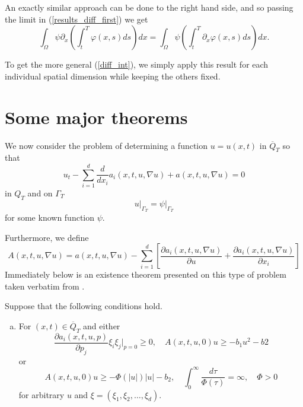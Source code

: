 \documentclass[11pt, a4paper]{article}
\begin{document}
\begin{appendices}
An exactly similar approach can be done to the right hand side, and so passing the limit in (\ref{results_diff_first}) we get
\begin{equation}
\label{result_diff_final}
\int_\Omega \psi \partial_x\left(\int_t^T \varphi(x,s)ds\right)dx = \int_\Omega \psi \left( \int_t^T \partial_x \varphi(x,s)ds \right) dx.
\end{equation}

To get the more general (\ref{diff_int}), we simply apply this result for each individual spatial dimension while keeping the others fixed.
\section{Some major theorems}
We now consider the problem of determining a function $u = u(x,t)$ in $\overline{Q}_T$ so that
\begin{equation}
\label{lady_parabolic_eq}
	u_t - \sum_{i=1}^d\frac{d}{dx_i}a_i(x,t,u,\nabla u) + a(x,t,u,\nabla u) = 0
\end{equation}
in $Q_T$ and on $\Gamma_T$
\begin{equation}
\label{lady_bc}
	u\big|_{\Gamma_T} = \psi\big|_{\Gamma_T}
\end{equation}
for some known function $\psi$.

Furthermore, we define
\begin{equation*}
A(x,t,u,\nabla u) = a(x,t,u,\nabla u) - \sum_{i=1}^d \left[ \frac{\partial a_i(x,t,u,\nabla u)}{\partial u} + \frac{\partial a_i(x,t,u,\nabla u)}{\partial x_i} \right]
\end{equation*}
Immediately below is an existence theorem presented on this type of problem taken
verbatim from \citep[ Theorem 6.1, p. 452]{ladyzhenskaya}.

\begin{theorem}
\label{thm:classical_existence}
Suppose that the following conditions hold.
\begin{enumerate}[a)]
	\item For $(x,t) \in \overline{Q}_T$ and either
	\begin{equation}
		\label{exist_cond1}
		\frac{\partial a_i(x,t,u,p)}{\partial p_j}\xi_i \xi_j \Bigg|_{p=0} \geq 0, \quad A(x,t,u,0)u \geq -b_1 u^2 - b2
	\end{equation}
	or
	\begin{equation}
	\label{exist_cond2}
	A(x,t,u,0)u \geq -\Phi(|u|)|u| - b_2, \quad \int_0^\infty \frac{d\tau}{\Phi(\tau)}= \infty, \quad \Phi > 0
	\end{equation}
	for arbitrary $u$ and $\xi = (\xi_1, \xi_2, \ldots, \xi_d)$.
	

\end{enumerate}
\end{theorem}
\end{appendices}
\end{document}
